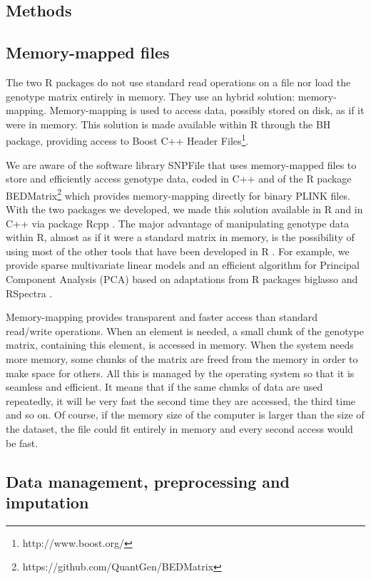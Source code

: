 \documentclass{bioinfo}
\begin{document}
\begin{methods}
\section{Methods}

\subsection{Memory-mapped files}

The two R packages do not use standard read operations on a file nor load the genotype matrix entirely in memory. They use an hybrid solution: memory-mapping. Memory-mapping is used to access data, possibly stored on disk, as if it were in memory. This solution is made available within R through the BH package, providing access to Boost C++ Header Files\footnote{http://www.boost.org/}.

We are aware of the software library SNPFile that uses memory-mapped files to store and efficiently access genotype data, coded in C++ \cite[]{Nielsen2008} and of the R package BEDMatrix\footnote{https://github.com/QuantGen/BEDMatrix} which provides memory-mapping directly for binary PLINK files. With the two packages we developed, we made this solution available in R and in C++ via package Rcpp \cite[]{Eddelbuettel2011}. The major advantage of manipulating genotype data within R, almost as if it were a standard matrix in memory, is the possibility of using most of the other tools that have been developed in R \cite[]{R2017}. For example, we provide sparse multivariate linear models and an efficient algorithm for Principal Component Analysis (PCA) based on adaptations from R packages biglasso and RSpectra \cite[]{RSpectra2016,Zeng2017}.

Memory-mapping provides transparent and faster access than standard read/write operations. 
When an element is needed, a small chunk of the genotype matrix, containing this element, is accessed in memory. 
When the system needs more memory, some chunks of the matrix are freed from the memory in order to make space for others. 
All this is managed by the operating system so that it is seamless and efficient. 
It means that if the same chunks of data are used repeatedly, it will be very fast the second time they are accessed, the third time and so on. 
Of course, if the memory size of the computer is larger than the size of the dataset, the file could fit entirely in memory and every second access would be fast. 


\subsection{Data management, preprocessing and imputation} \label{sec:preprocess}


\end{methods}
\end{document}
